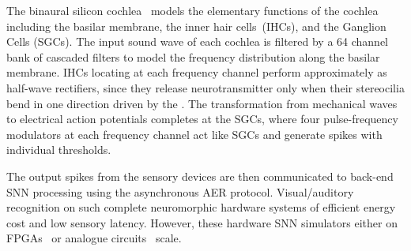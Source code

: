 The binaural silicon cochlea~\citep{5537164} models the elementary functions of the cochlea including the basilar membrane, the inner hair cells~(IHCs), and the \DIFdelbegin {}\DIFdelend \DIFaddbegin {}\DIFaddend Ganglion Cells (SGCs).
The input sound wave of each cochlea is filtered by a 64 channel bank of cascaded filters to model the frequency distribution along the basilar membrane.
IHCs locating at each frequency channel perform approximately as half-wave rectifiers, since they release neurotransmitter only when their stereocilia bend in one direction driven by the \DIFdelbegin {}\DIFdelend \DIFaddbegin {}\DIFaddend .
The transformation from mechanical waves to electrical action potentials completes at the \DIFdelbegin {}\DIFdelend SGCs, where four pulse-frequency modulators at each frequency channel act like SGCs and generate spikes with individual thresholds.


The output spikes from the sensory devices are then communicated to back-end SNN processing using the asynchronous AER protocol.
Visual/auditory recognition on such complete neuromorphic hardware systems \DIFdelbegin {}\DIFdelend \DIFaddbegin {}\DIFaddend of efficient energy cost and low sensory latency.
However, these hardware SNN simulators either \DIFdelbegin {}\DIFdelend \DIFaddbegin {}\DIFaddend on FPGAs~\citep{neil2014minitaur, kiselev2016event} or analogue circuits~\citep{qiao2015reconfigurable} \DIFdelbegin {}\DIFdelend \DIFaddbegin {}\DIFaddend scale.


